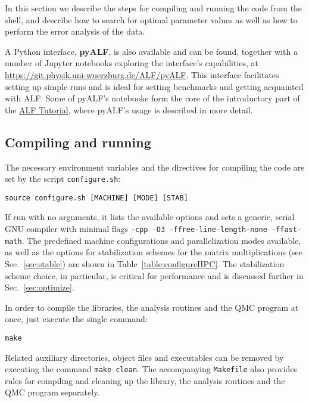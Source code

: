 


In this section we describe the steps for compiling and running the code from the shell, and describe how to search for optimal parameter values as well as how to perform the error analysis of the data.

A Python interface, \textbf{pyALF}, is also available and can be found, together with a number of Jupyter notebooks exploring the interface's capabilities, at \url{https://git.physik.uni-wuerzburg.de/ALF/pyALF}. This interface facilitates setting up simple runs and is ideal for setting benchmarks and getting acquainted with ALF. Some of pyALF's notebooks form the core of the introductory part of the \href{https://git.physik.uni-wuerzburg.de/ALF/ALF_Tutorial}{ALF Tutorial}, where pyALF's usage is described in more detail.

\subsection{Compiling and running}
\label{sec:compilation}

The necessary environment variables and the directives for compiling the code are set by the script \texttt{configure.sh}:
\begin{lstlisting}[style=bash]
source configure.sh [MACHINE] [MODE] [STAB]
\end{lstlisting}
If run with no arguments, it lists the available options and sets a generic, serial GNU compiler with minimal flags \texttt{-cpp -O3 -ffree-line-length-none -ffast-math}. The predefined machine configurations and parallelization modes available, as well as the options for stabilization schemes for the matrix multiplications (see Sec.~\ref{sec:stable}) are shown in Table~\ref{table:configureHPC}. The stabilization scheme choice, in particular, is critical for performance and is discussed further in Sec.~\ref{sec:optimize}.

In order to compile the libraries, the analysis routines and the QMC program at once, just execute the single command:%
\begin{lstlisting}[style=bash,morekeywords={make}]
make
\end{lstlisting}
Related auxiliary directories, object files and executables can be removed by executing the command \lstinline[style=bash,morekeywords={make}]{make clean}. The accompanying \texttt{Makefile} also provides rules for compiling and cleaning up the library, the analysis routines and the QMC program separately.  

